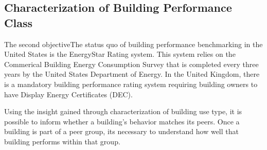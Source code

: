 \subsection{Characterization of Building Performance Class}
\label{sec:results_benchmarking}

The second objectiveThe status quo of building performance benchmarking in the United States is the EnergyStar Rating system. This system relies on the Commerical Building Energy Consumption Survey that is completed every three years by the United States Department of Energy. In the United Kingdom, there is a mandatory building performance rating system requiring building owners to have Display Energy Certificates (DEC).

Using the insight gained through characterization of building use type, it is possible to inform whether a building's behavior matches its peers. Once a building is part of a peer group, its necessary to understand how well that building performs within that group. 

